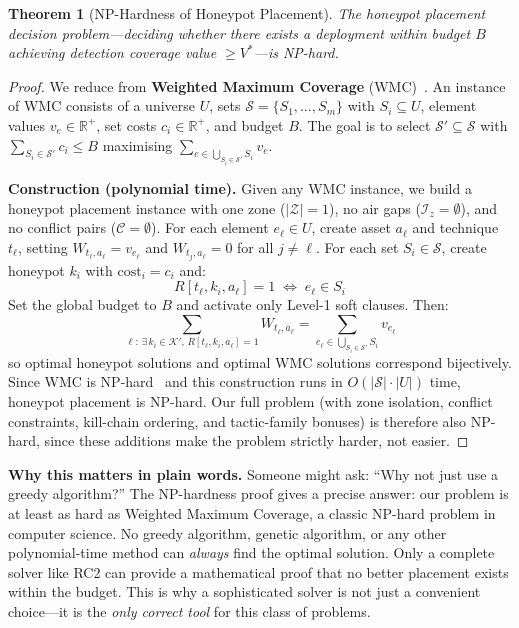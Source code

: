 \documentclass[journal]{IEEEtran}
\newtheorem{theorem}{Theorem}
\newcommand{\calK}{\mathcal{K}}
\newcommand{\calZ}{\mathcal{Z}}
\newcommand{\calC}{\mathcal{C}}
\begin{document}
\begin{theorem}[NP-Hardness of Honeypot Placement]
\label{thm:nphard}
The honeypot placement decision problem---deciding whether
there exists a deployment within budget $B$ achieving
detection coverage value $\geq V^*$---is NP-hard.
\end{theorem}

\begin{proofbox}
\begin{proof}
We reduce from \textbf{Weighted Maximum Coverage}
(WMC)~\cite{feige1998}.
An instance of WMC consists of a universe $U$, sets
$\mathcal{S} = \{S_1, \ldots, S_m\}$ with $S_i \subseteq U$,
element values $v_e \in \mathbb{R}^+$, set costs
$c_i \in \mathbb{R}^+$, and budget $B$.
The goal is to select $\mathcal{S}' \subseteq \mathcal{S}$
with $\sum_{S_i \in \mathcal{S}'} c_i \leq B$ maximising
$\sum_{e \in \bigcup_{S_i \in \mathcal{S}'} S_i} v_e$.

\noindent\textbf{Construction (polynomial time).}
Given any WMC instance, we build a honeypot placement
instance with one zone ($|\calZ|=1$), no air gaps
($\mathcal{I}_z = \emptyset$), and no conflict pairs
($\calC = \emptyset$).
For each element $e_\ell \in U$, create asset $a_\ell$
and technique $t_\ell$, setting
$W_{t_\ell,a_\ell} = v_{e_\ell}$ and
$W_{t_j,a_\ell}=0$ for all $j \neq \ell$.
For each set $S_i \in \mathcal{S}$, create honeypot
$k_i$ with $\mathrm{cost}_i = c_i$ and:
\begin{equation}
  R[t_\ell,k_i,a_\ell] = 1 \;\iff\; e_\ell \in S_i
  \label{eq:rmap}
\end{equation}
Set the global budget to $B$ and activate only Level-1
soft clauses.
Then:
\begin{equation}
  \sum_{\ell:\,\exists\,k_i\in\calK',\,R[t_\ell,k_i,a_\ell]=1}
  W_{t_\ell,a_\ell}
  = \sum_{e_\ell \in \bigcup_{S_i \in \mathcal{S}'}S_i} v_{e_\ell}
  \label{eq:objmap}
\end{equation}
so optimal honeypot solutions and optimal WMC solutions
correspond bijectively.
Since WMC is NP-hard~\cite{feige1998} and this construction
runs in $O(|\mathcal{S}|\cdot|U|)$ time, honeypot
placement is NP-hard.
Our full problem (with zone isolation, conflict constraints,
kill-chain ordering, and tactic-family bonuses) is
therefore also NP-hard, since these additions make the
problem strictly harder, not easier.
\end{proof}
\end{proofbox}

\begin{examplebox}
\textbf{Why this matters in plain words.}
Someone might ask: ``Why not just use a greedy algorithm?''
The NP-hardness proof gives a precise answer: our problem
is at least as hard as Weighted Maximum Coverage, a
classic NP-hard problem in computer science.
No greedy algorithm, genetic algorithm, or any other
polynomial-time method can \emph{always} find the optimal
solution.
Only a complete solver like RC2 can provide a mathematical
proof that no better placement exists within the budget.
This is why a sophisticated solver is not just a convenient
choice---it is the \emph{only correct tool} for this
class of problems.
\end{examplebox}
\end{document}
